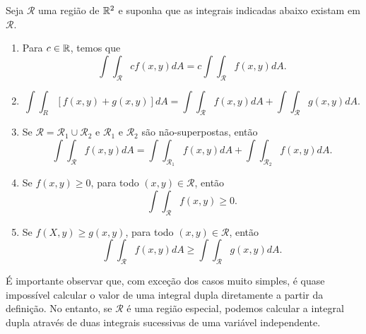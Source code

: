 \begin{theorem}
    Seja \(\mathcal{R}\) uma região de \(\mathbb{R}^2\) e suponha que as integrais indicadas abaixo existam em \(\mathcal{R}\).
        \begin{enumerate}
            \item Para \(c\in\mathbb{R}\), temos que \[\int\int_\mathcal{R} c f(x,y) dA = c \int\int_\mathcal{R} f(x,y) dA.\]
            \item \[\int\int_R [f(x,y) + g(x,y)] dA = \int\int_\mathcal{R} f(x,y) dA + \int\int_\mathcal{R} g(x,y) dA.\]
            \item Se \(\mathcal{R} = \mathcal{R}_1\cup\mathcal{R}_2\) e \(\mathcal{R}_1\) e \(\mathcal{R}_2\) são não-superpostas, então \[\int\int_\mathcal{R} f(x,y) dA = \int\int_{\mathcal{R}_1} f(x,y) dA + \int\int_{\mathcal{R}_2} f(x,y) dA.\]
            \item Se \(f(x,y)\geq 0\), para todo \((x,y)\in\mathcal{R}\), então \[\int\int_\mathcal{R} f(x,y) \geq 0.\]
            \item Se \(f(X,y) \geq g(x,y)\), para todo \((x,y)\in\mathcal{R}\), então \[\int\int_\mathcal{R} f(x,y)dA \geq \int\int_\mathcal{R} g(x,y) dA.\]
        \end{enumerate}
\end{theorem}

É importante observar que, com exceção dos casos muito simples, é quase impossível calcular o valor de uma integral dupla diretamente a partir da definição. No entanto, se \(\mathcal{R}\) é uma região especial, podemos calcular a integral dupla através de duas integrais sucessivas de uma variável independente.

